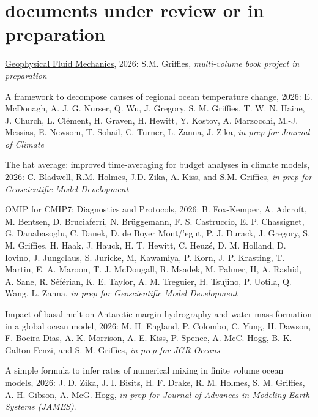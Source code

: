 \section*{\sc \color{Maroon} documents under review or in preparation}

\small 

\begin{etaremune}

\item \href{https://stephengriffies.github.io/book/}{Geophysical Fluid Mechanics}, 2026: S.M. Grif\/f\/ies, {\it multi-volume book project in preparation}

\item A framework to decompose causes of regional ocean temperature change, 2026: E. McDonagh, A. J. G. Nurser, Q. Wu, J. Gregory, S. M. Grif\/f\/ies, T. W. N. Haine, J. Church, L. {Cl\'{e}ment}, H. Graven, H. Hewitt, Y. Kostov, A. Marzocchi, M.-J. Messias, E. Newsom, T. Sohail, C. Turner, L. Zanna, J. Zika, {\it in prep for Journal of Climate}

\item The hat average: improved time-averaging for budget analyses in climate models, 2026: C. Bladwell,  R.M. Holmes, J.D. Zika, A. Kiss, and S.M. Grif\/f\/ies, {\it in prep for Geoscientific Model Development}

\item OMIP for CMIP7: Diagnostics and Protocols, 2026: B. Fox-Kemper, A. Adcroft, M. Bentsen, D. Bruciaferri, N. {Br\"{u}ggemann, F. S. Castruccio, E. P. Chassignet, G. Danabasoglu, C. Danek, D. de Boyer {Mont/'{e}gut}, P. J. Durack, J. Gregory, S. M. Grif\/f\/ies, H. Haak, J. Hauck, H. T. Hewitt, C. Heuz\'{e}}, D. M. Holland, D. Iovino, J. Jungclaus, S. Juricke, M, Kawamiya, P. Korn, J. P. Krasting,  T. Martin, E. A. Maroon, T. J. McDougall, R. Msadek, M. Palmer, H, A. Rashid, A. Sane, R. {S\'{e}f\'{e}rian}, K. E. Taylor, A. M. Treguier, H. Tsujino, P. Uotila, Q. Wang, L. Zanna, {\it in prep for Geoscientific Model Development}

\item Impact of basal melt on Antarctic margin hydrography and water-mass formation in a global ocean model, 2026: M. H. England, P. Colombo,  C. Yung, H. Dawson, F. Boeira Dias, A. K. Morrison, A. E. Kiss, P. Spence, A. McC. Hogg, B. K. Galton-Fenzi, and S. M. Grif\/f\/ies, {\it in prep for JGR-Oceans}

\item A simple formula to infer rates of numerical mixing in finite volume ocean models, 2026: J. D. Zika, J. I. Bisits, H. F. Drake, R. M. Holmes, S. M. Grif\/f\/ies, A. H. Gibson, A. McG. Hogg, {\it in prep for Journal of Advances in Modeling Earth Systems (JAMES)}.


\end{etaremune}
